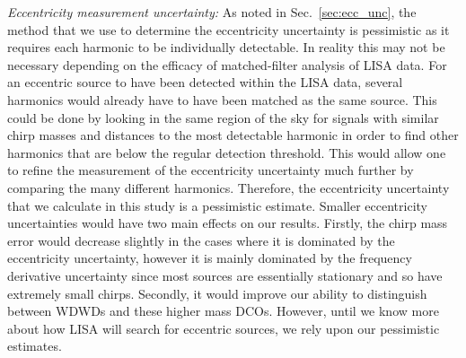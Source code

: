 \textit{Eccentricity measurement uncertainty:} As noted in Sec.~\ref{sec:ecc_unc}, the method that we use to determine the eccentricity uncertainty is pessimistic as it requires each harmonic to be individually detectable. In reality this may not be necessary depending on the efficacy of matched-filter analysis of LISA data. For an eccentric source to have been detected within the LISA data, several harmonics would already have to have been matched as the same source. This could be done by looking in the same region of the sky for signals with similar chirp masses and distances to the most detectable harmonic in order to find other harmonics that are below the regular detection threshold. This would allow one to refine the measurement of the eccentricity uncertainty much further by comparing the many different harmonics. Therefore, the eccentricity uncertainty that we calculate in this study is a pessimistic estimate. Smaller eccentricity uncertainties would have two main effects on our results. Firstly, the chirp mass error would decrease slightly in the cases where it is dominated by the eccentricity uncertainty, however it is mainly dominated by the frequency derivative uncertainty since most sources are essentially stationary and so have extremely small chirps. Secondly, it would improve our ability to distinguish between WDWDs and these higher mass DCOs. However, until we know more about how LISA will search for eccentric sources, we rely upon our pessimistic estimates.